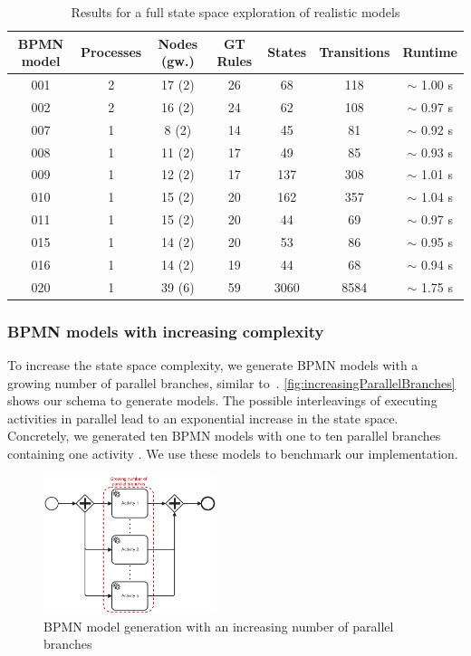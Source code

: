 \documentclass{lmcs} %
\begin{document}
\begin{table}[ht]
\centering
\caption{Results for a full state space exploration of realistic models}

\begin{tabular}{| c | c | c || c || c | c | c |}
 \hline
 BPMN model & Processes & Nodes (gw.) & GT Rules & States & Transitions & Runtime \\
 \hline\hline
 001 & 2 & 17 (2) & 26 & 68 & 118 & $\sim$ 1.00 s \\
 \hline
 002 & 2 & 16 (2) & 24 & 62 & 108 & $\sim$ 0.97 s \\
 \hline
 007 & 1 & 8 (2) & 14 & 45 & 81 & $\sim$ 0.92 s \\
 \hline
 008 & 1 & 11 (2) & 17 & 49 & 85 & $\sim$ 0.93 s \\
 \hline
 009 & 1 & 12 (2) & 17 & 137 & 308 & $\sim$ 1.01 s \\
 \hline
 010 & 1 & 15 (2) & 20 & 162 & 357 & $\sim$ 1.04 s \\
 \hline
 011 & 1 & 15 (2) & 20 & 44 & 69 & $\sim$ 0.97 s \\
 \hline
 015 & 1 & 14 (2) & 20 & 53 & 86 & $\sim$ 0.95 s \\
 \hline
 016 & 1 & 14 (2) & 19 & 44 & 68 & $\sim$ 0.94 s \\
 \hline
 020 & 1 & 39 (6) & 59 & 3060 & 8584 & $\sim$ 1.75 s \\
 \hline
\end{tabular}
\label{table:stateSpaceBenchmark}
\end{table}

\subsubsection{BPMN models with increasing complexity}

To increase the state space complexity, we generate BPMN models with a growing number of parallel branches, similar to~\cite{corradiniFormalApproachAnalysis2021}.
\autoref{fig:increasingParallelBranches} shows our schema to generate models.
The possible interleavings of executing activities in parallel lead to an exponential increase in the state space.
Concretely, we generated ten BPMN models with one to ten parallel branches containing one activity \cite{timkrauterLMCS2024Artifacts2023}.
We use these models to benchmark our implementation.

\begin{figure}[ht]
    \centering
    \includegraphics[width=0.45\textwidth]{images/parallel_branches.pdf}
    \caption{BPMN model generation with an increasing number of parallel branches}
    \label{fig:increasingParallelBranches}
\end{figure}
\end{document}
